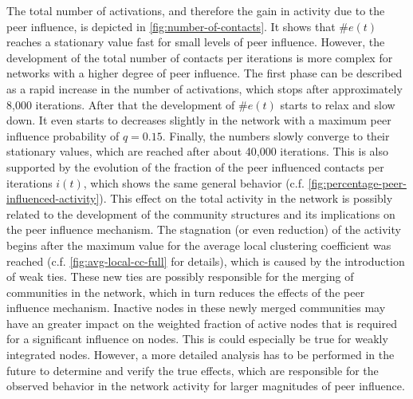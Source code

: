 The total number of activations, and therefore the gain in activity due to the peer influence, is depicted in \cref{fig:number-of-contacts}.
It shows that \( \#e(t) \) reaches a stationary value fast for small levels of peer influence.
However, the development of the total number of contacts per iterations is more complex for networks with a higher degree of peer influence.
The first phase can be described as a rapid increase in the number of activations, which stops after approximately 8,000 iterations.
After that the development of \( \#e(t) \) starts to relax and slow down.
It even starts to decreases slightly in the network with a maximum peer influence probability of \( q = 0.15 \).
Finally, the numbers slowly converge to their stationary values, which are reached after about 40,000 iterations.
This is also supported by the evolution of the fraction of the peer influenced contacts per iterations \( i(t) \), which shows the same general behavior (c.f. \cref{fig:percentage-peer-influenced-activity}).
This effect on the total activity in the network is possibly related to the development of the community structures and its implications on the peer influence mechanism.
The stagnation (or even reduction) of the activity begins after the maximum value for the average local clustering coefficient was reached (c.f. \cref{fig:avg-local-cc-full} for details), which is caused by the introduction of weak ties.
These new ties are possibly responsible for the merging of communities in the network, which in turn reduces the effects of the peer influence mechanism.
Inactive nodes in these newly merged communities may have an greater impact on the weighted fraction of active nodes that is required for a significant influence on nodes.
This is could especially be true for weakly integrated nodes.
However, a more detailed analysis has to be performed in the future to determine and verify the true effects, which are responsible for the observed behavior in the network activity for larger magnitudes of peer influence. 


